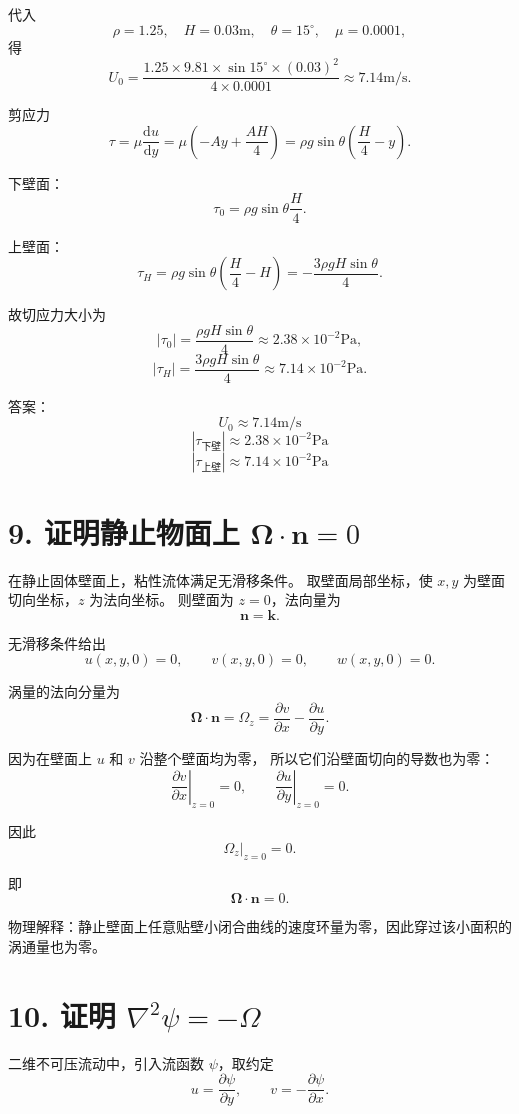 ﻿\documentclass[12pt,a4paper]{ctexart}
\newcommand{\dd}{\mathrm d}
\begin{document}
代入
\[
\rho=1.25,\quad
H=0.03\mathrm m,\quad
\theta=15^\circ,\quad
\mu=0.0001,
\]
得
\[
U_0=
\frac{1.25\times9.81\times\sin15^\circ\times(0.03)^2}{4\times0.0001}
\approx7.14\mathrm{m/s}.
\]

剪应力
\[
\tau=\mu\frac{\dd u}{\dd y}
=\mu\left(-Ay+\frac{AH}{4}\right)
=\rho g\sin\theta\left(\frac H4-y\right).
\]

下壁面：
\[
\tau_0=\rho g\sin\theta\frac H4.
\]

上壁面：
\[
\tau_H=\rho g\sin\theta\left(\frac H4-H\right)
=-\frac{3\rho gH\sin\theta}{4}.
\]

故切应力大小为
\[
|\tau_0|
=\frac{\rho gH\sin\theta}{4}
\approx2.38\times10^{-2}\mathrm{Pa},
\]
\[
|\tau_H|
=\frac{3\rho gH\sin\theta}{4}
\approx7.14\times10^{-2}\mathrm{Pa}.
\]

答案：
\[
\boxed{U_0\approx7.14\mathrm{m/s}}
\]
\[
\boxed{|\tau_{\text{下壁}}|\approx2.38\times10^{-2}\mathrm{Pa}}
\]
\[
\boxed{|\tau_{\text{上壁}}|\approx7.14\times10^{-2}\mathrm{Pa}}
\]

\section*{9. 证明静止物面上 \(\bm\Omega\cdot\bm n=0\)}

在静止固体壁面上，粘性流体满足无滑移条件。
取壁面局部坐标，使 \(x,y\) 为壁面切向坐标，\(z\) 为法向坐标。
则壁面为 \(z=0\)，法向量为
\[
\bm n=\bm k.
\]

无滑移条件给出
\[
u(x,y,0)=0,\qquad v(x,y,0)=0,\qquad w(x,y,0)=0.
\]

涡量的法向分量为
\[
\bm\Omega\cdot\bm n
=\Omega_z
=\frac{\partial v}{\partial x}
-\frac{\partial u}{\partial y}.
\]

因为在壁面上 \(u\) 和 \(v\) 沿整个壁面均为零，
所以它们沿壁面切向的导数也为零：
\[
\left.\frac{\partial v}{\partial x}\right|_{z=0}=0,
\qquad
\left.\frac{\partial u}{\partial y}\right|_{z=0}=0.
\]

因此
\[
\left.\Omega_z\right|_{z=0}=0.
\]

即
\[
\boxed{
\bm\Omega\cdot\bm n=0.
}
\]

物理解释：静止壁面上任意贴壁小闭合曲线的速度环量为零，因此穿过该小面积的涡通量也为零。

\section*{10. 证明 \(\nabla^2\psi=-\Omega\)}

二维不可压流动中，引入流函数 \(\psi\)，取约定
\[
u=\frac{\partial\psi}{\partial y},
\qquad
v=-\frac{\partial\psi}{\partial x}.
\]
\end{document}
